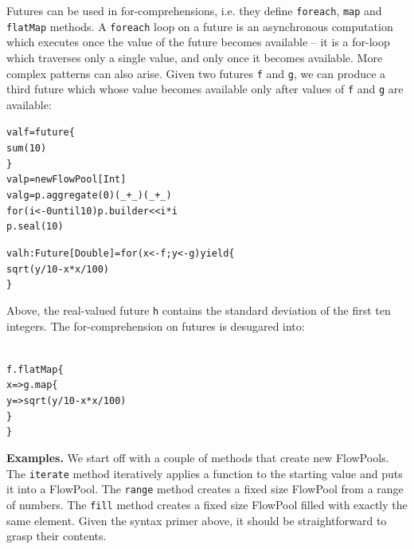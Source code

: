 \documentclass[runningheads,a4paper]{llncs}
\begin{document}
Futures can be used in for-comprehensions, i.e. they define \verb=foreach=,
\verb=map= and \verb=flatMap= methods.
A \verb=foreach= loop on a future is an asynchronous computation which executes
once the value of the future becomes available -- it is a for-loop which traverses
only a single value, and only once it becomes available.
More complex patterns can also arise.
Given two futures \verb=f= and \verb=g=, we can produce a third future which
whose value becomes available only after values of \verb=f= and \verb=g=
are available:

\begin{minipage}[b]{3.75 cm}
\begin{alltt}
{\scriptsize
val f = future \{
  sum(10)
\}
val p = new FlowPool[Int]
val g = p.aggregate(0)(_ + _)(_ + _)
for (i <- 0 until 10) p.builder << i * i
p.seal(10)

val h: Future[Double] = for (x <- f; y <- g) yield \{
  sqrt(y / 10 - x * x / 100)
\}
}
\end{alltt}
\end{minipage}

Above, the real-valued future \verb=h= contains the standard
deviation of the first ten integers.
The for-comprehension on futures is desugared into:

\begin{minipage}[b]{3.75 cm}
\begin{alltt}
{\scriptsize
f.flatMap \{
  x => g.map \{
    y => sqrt(y / 10 - x * x / 100)
  \}
\}
}
\end{alltt}
\end{minipage}


\textbf{Examples.}
We start off with a couple of methods that create new FlowPools.
The \verb=iterate= method iteratively applies a function to the starting
value and puts it into a FlowPool.
The \verb=range= method creates a fixed size FlowPool from a range of numbers.
The \verb=fill= method creates a fixed size FlowPool filled with exactly
the same element.
Given the syntax primer above, it should be straightforward to grasp
their contents.
\end{document}

